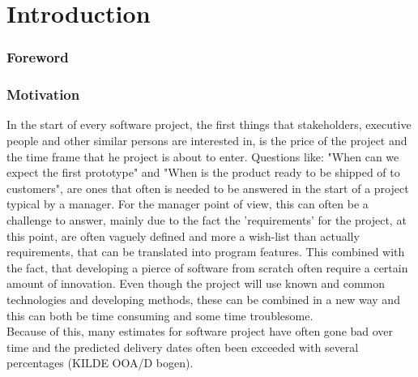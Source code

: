 \part{Introduction}
\section{Foreword}
\section{Motivation}
In the start of every software project, the first things that stakeholders, executive people and other similar persons are interested in, is the price of the project and the time frame that he project is about to enter. Questions like: "When can we expect the first prototype" and "When is the product ready to be shipped of to customers", are  ones that often is needed to be answered in the start of a project typical by a manager. For the manager point of view, this can often be a challenge to answer, mainly due to the fact the 'requirements' for the project, at this point, are often vaguely defined and more a wish-list than actually requirements, that can be translated into program features. This combined with the fact, that developing a pierce of software from scratch often require a certain amount of innovation. Even though the project  will use known and common technologies and developing methods, these can be combined in a new way and this can both be time consuming and some time troublesome.\\
Because of this, many estimates for software project have often gone bad over time and the predicted delivery dates often been exceeded with several percentages (KILDE OOA/D bogen).  	